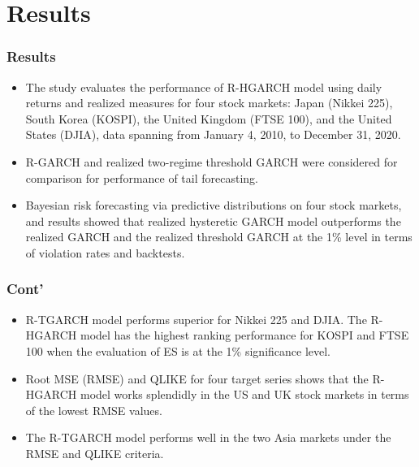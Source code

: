\documentclass[unknownkeysallowed]{beamer}
\begin{document}
\section{Results}
\begin{frame}[plain]
	\frametitle{\textbf{Results}}
	\begin{itemize}
		\item The study evaluates the performance of R-HGARCH model
		using daily returns and realized measures for four stock markets: Japan (Nikkei 225), South Korea (KOSPI), the United Kingdom (FTSE 100), and the United States (DJIA), data spanning from January 4, 2010, to December 31, 2020.
		\item R-GARCH and realized two-regime threshold GARCH were considered for comparison for performance of tail forecasting. 
		
		\item Bayesian risk forecasting via predictive distributions on four stock markets, and results showed that realized hysteretic GARCH model outperforms the realized GARCH and the realized threshold GARCH at the 1\% level in terms of violation rates and backtests.
	\end{itemize}
\end{frame}
\begin{frame}[plain]
	\frametitle{\textbf{Cont'}}
	\begin{itemize}
		\item R-TGARCH model performs superior for Nikkei 225 and DJIA. The R-HGARCH model has the highest ranking performance for KOSPI and FTSE 100 when the evaluation of ES is at the 1\% significance level. \item Root MSE (RMSE) and QLIKE for four target series shows that the R-HGARCH model works splendidly in the US and UK stock markets in terms of the lowest RMSE values.
		\item The R-TGARCH model performs well in the two Asia markets under the RMSE and QLIKE criteria.
	\end{itemize}
\end{frame}
\end{document}
